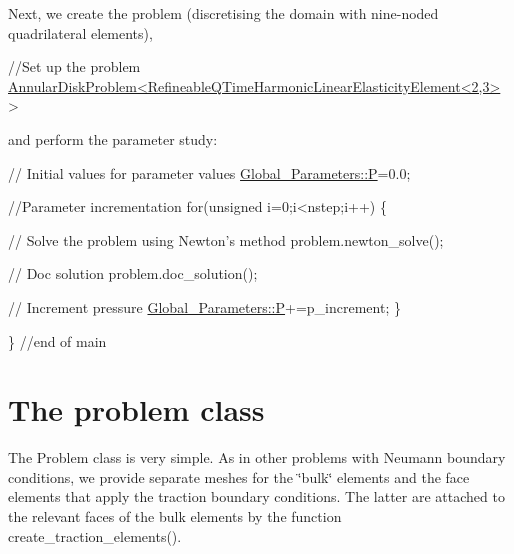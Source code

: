 Next, we create the problem (discretising the domain with nine-\/noded quadrilateral elements), 
\begin{DoxyCodeInclude}
 \textcolor{comment}{//Set up the problem}
 \hyperlink{classAnnularDiskProblem}{AnnularDiskProblem<RefineableQTimeHarmonicLinearElasticityElement<2,3>}
       >

\end{DoxyCodeInclude}


and perform the parameter study\+:


\begin{DoxyCodeInclude}
 \textcolor{comment}{// Initial values for parameter values}
 \hyperlink{namespaceGlobal__Parameters_a31fb55c20db4aa0127aafa20f0d76731}{Global\_Parameters::P}=0.0; 
 
 \textcolor{comment}{//Parameter incrementation}
 \textcolor{keywordflow}{for}(\textcolor{keywordtype}{unsigned} i=0;i<nstep;i++)
  \{

\end{DoxyCodeInclude}



\begin{DoxyCodeInclude}
   \textcolor{comment}{// Solve the problem using Newton's method}
   problem.newton\_solve();

\end{DoxyCodeInclude}



\begin{DoxyCodeInclude}
   \textcolor{comment}{// Doc solution}
   problem.doc\_solution();
   
   \textcolor{comment}{// Increment pressure}
   \hyperlink{namespaceGlobal__Parameters_a31fb55c20db4aa0127aafa20f0d76731}{Global\_Parameters::P}+=p\_increment;
  \}
 
\} \textcolor{comment}{//end of main}

\end{DoxyCodeInclude}




 

\hypertarget{index_problem}{}\section{The problem class}\label{index_problem}
The {\ttfamily Problem} class is very simple. As in other problems with Neumann boundary conditions, we provide separate meshes for the \char`\"{}bulk\char`\"{} elements and the face elements that apply the traction boundary conditions. The latter are attached to the relevant faces of the bulk elements by the function {\ttfamily create\+\_\+traction\+\_\+elements()}.

